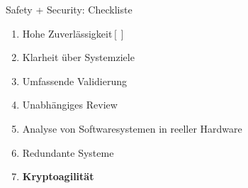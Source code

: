 \begin{frame}[T]{Safety + Security: Checkliste}
  \begin{enumerate}
    \item Hohe Zuverlässigkeit\hfill $[ ]$
    \item Klarheit über Systemziele
    \item Umfassende Validierung
	\item Unabhängiges Review
    \item Analyse von Softwaresystemen in reeller Hardware
    \item Redundante Systeme
    \item \textbf{Kryptoagilität}
  \end{enumerate}
\end{frame}
